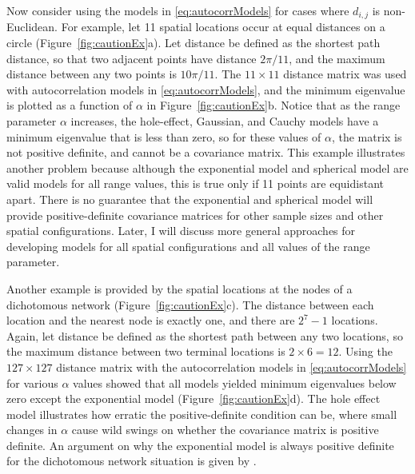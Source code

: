 \documentclass[11pt, titlepage]{article}\usepackage[]{graphicx}\usepackage[]{color}
\begin{document}
\begin{spacing}{1.9}
\begin{flushleft}
Now consider using the models in \ref{eq:autocorrModels} for cases where $d_{i,j}$ is non-Euclidean.  For example, let 11 spatial locations occur at equal distances on a circle (Figure~\ref{fig:cautionEx}a).  Let distance be defined as the shortest path distance, so that two adjacent points have distance $2\pi/11$, and the maximum distance between any two points is $10\pi/11$.  The $11 \times 11$ distance matrix was used with autocorrelation models in \ref{eq:autocorrModels}, and the minimum eigenvalue is plotted as a function of $\alpha$ in Figure~\ref{fig:cautionEx}b.  Notice that as the range parameter $\alpha$ increases, the hole-effect, Gaussian, and Cauchy models have a minimum eigenvalue that is less than zero, so for these values of $\alpha$, the matrix is not positive definite, and cannot be a covariance matrix. This example illustrates another problem because although the exponential model and spherical model are valid models for all range values, this is true only if 11
points are equidistant apart. There is no guarantee that the exponential and spherical model will provide positive-definite covariance matrices for other sample sizes and other spatial configurations.  Later, I will discuss more general approaches for developing models for all spatial configurations and all values of the range parameter.

Another example is provided by the spatial locations at the nodes of a dichotomous network (Figure~\ref{fig:cautionEx}c). The distance between each location and the nearest node is exactly one, and there are $2^7 - 1$ locations.  Again, let distance be defined as the shortest path between any two locations, so the maximum distance between two terminal locations is $2 \times 6 = 12$.  Using the $127 \times 127$ distance matrix with the autocorrelation models in \ref{eq:autocorrModels} for various $\alpha$ values showed that all models yielded minimum eigenvalues below zero except the exponential model (Figure~\ref{fig:cautionEx}d).  The hole effect model illustrates how erratic the positive-definite condition can be, where small changes in $\alpha$ cause wild swings on whether the covariance matrix is positive definite. An argument on why the exponential model is always positive definite for the dichotomous network situation is given by \citet{Ver:Pete:Move:2010}.


\end{flushleft}
\end{spacing}
\end{document}
